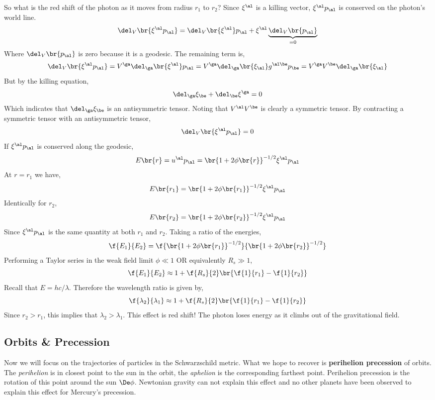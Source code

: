 \documentclass{article}
\begin{document}
So what is the red shift of the photon as it moves from radius $r_1$ to $r_2$? Since $\xi^\al$ is a killing vector, $\xi^\al p_\al$ is conserved on the photon's world line.
\[ \del_{V}\br{\xi^\al p_\al} = \del_{V}\br{\xi^\al} p_\al + \xi^\al \underbrace{\del_{V}\br{p_\al}}_{=0} \]
Where $\del_{V}\br{p_\al}$ is zero because it is a geodesic. The remaining term is,
\[ \del_{V}\br{\xi^\al p_\al} = V^\ga \del_{\ga}\br{\xi^\al} p_\al = V^\ga \del_{\ga}\br{\xi_\al} g^{\al\be} p_\be = V^\ga V^\be \del_{\ga}\br{\xi_\al} \]
But by the killing equation,
\[ \del_\ga \xi_\be + \del_\be \xi^\ga = 0 \]
Which indicates that $\del_\ga \xi_\be$ is an antisymmetric tensor. Noting that $V^\al V^\be$ is clearly a symmetric tensor. By contracting a symmetric tensor with an antisymmetric tensor,
\[ \del_{V}\br{\xi^\al p_\al} = 0 \]
If $\xi^\al p_\al$ is conserved along the geodesic,
\[ E\br{r} = u^\al p_\al = \br{1+2\phi\br{r}}^{-1/2} \xi^\al p_\al \]
At $r=r_1$ we have,
\[ E\br{r_1} = \br{1+2\phi\br{r_1}}^{-1/2} \xi^\al p_\al \]
Identically for $r_2$,
\[ E\br{r_2} = \br{1+2\phi\br{r_2}}^{-1/2} \xi^\al p_\al \]
Since $\xi^\al p_\al$ is the same quantity at both $r_1$ and $r_2$. Taking a ratio of the energies,
\[ \f{E_1}{E_2} = \f{\br{1+2\phi\br{r_1}}^{-1/2}}{\br{1+2\phi\br{r_2}}^{-1/2}} \]
Performing a Taylor series in the weak field limit $\phi \ll 1$ OR equivalently $R_s \gg 1$,
\[ \f{E_1}{E_2} \approx 1+\f{R_s}{2}\br{\f{1}{r_1} - \f{1}{r_2}} \]
Recall that $E = hc /\lambda$. Therefore the wavelength ratio is given by,
\[ \f{\lambda_2}{\lambda_1} \approx 1+\f{R_s}{2}\br{\f{1}{r_1} - \f{1}{r_2}} \]
Since $r_2 > r_1$, this implies that $\lambda_2 > \lambda_1$. This effect is red shift! The photon loses energy as it climbs out of the gravitational field.

\subsection{Orbits \& Precession}
Now we will focus on the trajectories of particles in the Schwarzschild metric. What we hope to recover is \textbf{perihelion precession} of orbits. The \textit{perihelion} is in closest point to the sun in the orbit, the \textit{aphelion} is the corresponding farthest point. Perihelion precession is the rotation of this point around the sun $\De \phi$. Newtonian gravity can not explain this effect and no other planets have been observed to explain this effect for Mercury's precession.\\
\end{document}
